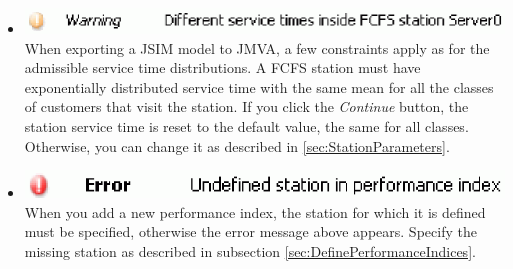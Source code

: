 \begin{itemize}
\item \includegraphics[scale=.5]{img/jsim/13.eps}\\
When exporting a JSIM model to JMVA, a few constraints apply as for the admissible service time distributions. A FCFS station must have exponentially distributed service time with the same mean for all the classes of customers that visit the station. If you click the \emph{Continue} button, the station service time is
reset to the default value, the same for all classes. Otherwise, you can change it as described in \autoref{sec:StationParameters}.
\item \includegraphics[scale=.5]{img/jsim/14.eps}\\
When you add a new performance index, the station for which it is defined must be specified, otherwise the error message above appears. Specify the missing station as described in subsection  \autoref{sec:DefinePerformanceIndices}.
\end{itemize}

